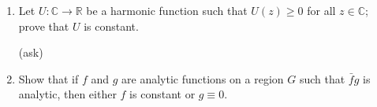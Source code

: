 \documentclass[11pt,oneside,english]{amsart}
\theoremstyle{definition}
\newcommand{\MB}[1]{\mathbb{#1}}
\begin{document}
\begin{enumerate}[leftmargin=*]
\begin{proof}
Now suppose that $f(z)g(z)=0$ for all $z\in G$ and suppose as well that $g\not\equiv 0$ on $G$. Then there exists an $a\in G$ such that $g(a)\neq 0$. Since $g$ is analytic, there exists a radius $R$ such that $g(z)\neq 0$ for all $z\in B(a,R)$. Consequently, $f\equiv 0$ on $B(a,R)$ so that $f(z)g(z)=0$ holds there. Since $f\equiv 0$ on $B(a,R)$, by the lemma above,we have that $f\equiv 0$ on $G$. 

Supposing instead that $f\not\equiv0$ in the beginning, and using a similar argument, we have that $g\equiv 0$. Thus, $f\equiv 0$ or $g\equiv 0$.
\end{proof}

\item Let $U:\MB{C}\to\MB{R}$ be a harmonic function such that $U(z)\geq 0$ for all $z\in \MB{C}$; prove that $U$ is constant.

(ask)

\item Show that if $f$ and $g$ are analytic functions on a region $G$ such that $\bar fg$ is analytic, then either $f$ is constant or $g\equiv 0$.
\end{enumerate}
\end{document}
